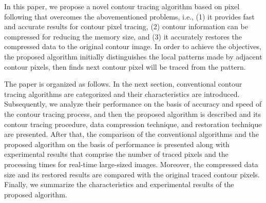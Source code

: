 In this paper, we propose a novel contour tracing algorithm based on pixel following that overcomes the abovementioned problems, i.e., (1) it provides fast and accurate results for contour pixel tracing, (2) contour information can be compressed for reducing the memory size, and (3) it accurately restores the compressed data to the original contour image. In order to achieve the objectives, the proposed algorithm initially distinguishes the local patterns made by adjacent contour pixels, then finds next contour pixel will be traced from the pattern. 

The paper is organized as follows. In the next section, conventional contour tracing algorithms are categorized and their characteristics are introduced. Subsequently, we analyze their performance on the basis of accuracy and speed of the contour tracing process, and then the proposed algorithm is described and its contour tracing procedure, data compression technique, and restoration technique are presented. After that, the comparison of the conventional algorithms and the proposed algorithm on the basis of performance is presented along with experimental results that comprise the number of traced pixels and the processing times for real-time large-sized images. Moreover, the compressed data size and its restored results are compared with the original traced contour pixels. Finally, we summarize the characteristics and experimental results of the proposed algorithm.